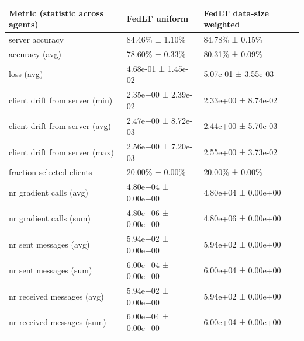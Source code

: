 \begin{tabular}{lll}
\hline
 Metric (statistic across agents)   & FedLT uniform       & FedLT data-size weighted   \\
\hline
 server accuracy                    & 84.46\% ± 1.10\%      & 84.78\% ± 0.15\%             \\
 accuracy (avg)                     & 78.60\% ± 0.33\%      & 80.31\% ± 0.09\%             \\
 loss (avg)                         & 4.68e-01 ± 1.45e-02 & 5.07e-01 ± 3.55e-03        \\
 client drift from server (min)     & 2.35e+00 ± 2.39e-02 & 2.33e+00 ± 8.74e-02        \\
 client drift from server (avg)     & 2.47e+00 ± 8.72e-03 & 2.44e+00 ± 5.70e-03        \\
 client drift from server (max)     & 2.56e+00 ± 7.20e-03 & 2.55e+00 ± 3.73e-02        \\
 fraction selected clients          & 20.00\% ± 0.00\%      & 20.00\% ± 0.00\%             \\
 nr gradient calls (avg)            & 4.80e+04 ± 0.00e+00 & 4.80e+04 ± 0.00e+00        \\
 nr gradient calls (sum)            & 4.80e+06 ± 0.00e+00 & 4.80e+06 ± 0.00e+00        \\
 nr sent messages (avg)             & 5.94e+02 ± 0.00e+00 & 5.94e+02 ± 0.00e+00        \\
 nr sent messages (sum)             & 6.00e+04 ± 0.00e+00 & 6.00e+04 ± 0.00e+00        \\
 nr received messages (avg)         & 5.94e+02 ± 0.00e+00 & 5.94e+02 ± 0.00e+00        \\
 nr received messages (sum)         & 6.00e+04 ± 0.00e+00 & 6.00e+04 ± 0.00e+00        \\
\hline
\end{tabular}